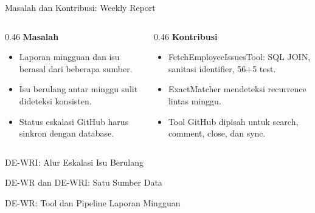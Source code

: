 \begin{comparisonframe}{Masalah dan Kontribusi: Weekly Report}
    \begin{columns}[T,onlytextwidth]
        \begin{column}{0.46\textwidth}
            \textbf{Masalah}\par
            \begin{itemize}\setlength{\itemsep}{3pt}
                \item Laporan mingguan dan isu berasal dari beberapa sumber.
                \item Isu berulang antar minggu sulit dideteksi konsisten.
                \item Status eskalasi GitHub harus sinkron dengan database.
            \end{itemize}
        \end{column}
        \begin{column}{0.46\textwidth}
            \textbf{Kontribusi}\par
            \begin{itemize}\setlength{\itemsep}{3pt}
                \item FetchEmployeeIssuesTool: SQL JOIN, sanitasi identifier, 56+5 test.
                \item ExactMatcher mendeteksi recurrence lintas minggu.
                \item Tool GitHub dipisah untuk search, comment, close, dan sync.
            \end{itemize}
        \end{column}
    \end{columns}
\end{comparisonframe}

\begin{contentframe}{DE-WRI: Alur Eskalasi Isu Berulang}
\end{contentframe}

\begin{contentframe}{DE-WR dan DE-WRI: Satu Sumber Data}
\end{contentframe}

\begin{contentframe}{DE-WR: Tool dan Pipeline Laporan Mingguan}
\end{contentframe}

